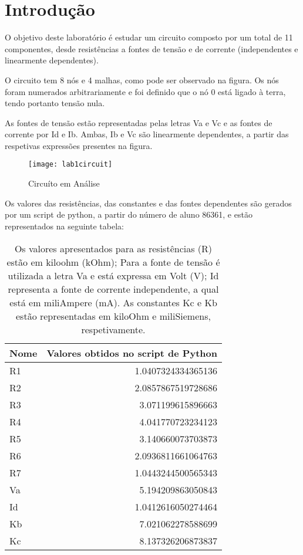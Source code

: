 \section{Introdução}
\label{sec:introdução}

\par O objetivo deste laboratório é estudar um circuito composto por um total de 11 componentes, desde resistências a fontes de tensão e de corrente (independentes e linearmente dependentes). \par
O circuito tem 8 nós e 4 malhas, como pode ser observado na figura. Os nós foram numerados arbitrariamente e foi definido que o nó 0 está ligado à terra, tendo portanto tensão nula.\par
As fontes de tensão estão representadas pelas letras Va e Vc e as fontes de corrente por Id e Ib. Ambas, Ib e Vc são linearmente dependentes, a partir das respetivas expressões presentes na figura.

\begin{figure}[h] \centering
\texttt{[image: lab1circuit]}
\caption{Circuíto em Análise}
\label{fig:lab1circuit}
\end{figure}

Os valores das resistências, das constantes e das fontes dependentes são gerados por um script de python, a partir do número de aluno 86361, e estão representados na seguinte tabela:

\begin{table}[h]
  \centering
  \begin{tabular}{|l|r|}
    \hline    
    {\bf Nome} & {\bf Valores obtidos no script de Python} \\ \hline
	R1 &  1.0407324334365136\\ \hline
	R2 &  2.0857867519728686\\ \hline
	R3 &  3.071199615896663  \\ \hline
	R4 &  4.041770723234123 \\ \hline
	R5 &  3.140660073703873\\ \hline
	R6 &  2.0936811661064763 \\ \hline
	R7 &  1.0443244500565343  \\ \hline
	Va &  5.194209863050843 \\ \hline
	Id &  1.0412616050274464 \\ \hline
	Kb &  7.021062278588699\\ \hline
	Kc &  8.137326206873837\\ \hline

  \end{tabular}
  \caption{Os valores apresentados para as resistências (R) estão em kiloohm (kOhm); Para a fonte de tensão é utilizada a letra Va e está expressa em Volt (V); Id representa a fonte de corrente independente, a qual está em  miliAmpere (mA). As constantes Kc e Kb estão representadas em kiloOhm e miliSiemens, respetivamente.}
  \label{tab:python_values}
\end{table}

